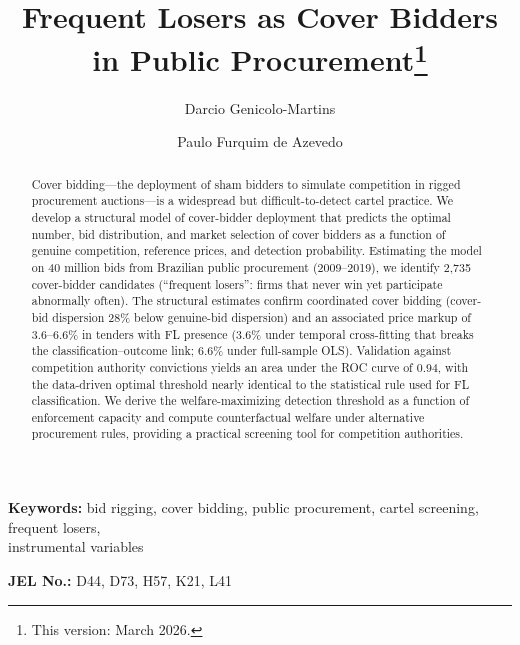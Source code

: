 \begin{frontmatter}

\title{Frequent Losers as Cover Bidders in Public Procurement\texorpdfstring{\footnote{This version: March 2026.}}{}}

\author[insper]{Darcio Genicolo-Martins}
\author[insper]{Paulo Furquim de Azevedo}

\begin{abstract} %
Cover bidding---the deployment of sham bidders to simulate competition
in rigged procurement auctions---is a widespread but difficult-to-detect
cartel practice. We develop a structural model of cover-bidder deployment
that predicts the optimal number, bid distribution, and market selection
of cover bidders as a function of genuine competition, reference prices,
and detection probability. Estimating the model on 40 million bids from
Brazilian public procurement (2009--2019), we identify 2,735
cover-bidder candidates (``frequent losers'': firms that never win yet
participate abnormally often). The structural estimates confirm coordinated cover %
bidding (cover-bid dispersion 28\% below genuine-bid dispersion) and
an associated price markup of 3.6--6.6\% in tenders with FL presence
(3.6\% under temporal cross-fitting that breaks the
classification--outcome link; 6.6\% under full-sample OLS).
Validation against competition authority convictions yields an area
under the ROC curve of 0.94, with the data-driven optimal threshold
nearly identical to the statistical rule used for FL classification.
We derive the welfare-maximizing detection threshold as a function of
enforcement capacity and compute counterfactual welfare under
alternative procurement rules, providing a practical screening tool
for competition authorities.
\end{abstract}

\end{frontmatter}

\noindent\textbf{Keywords:} bid rigging, cover bidding, public procurement, cartel screening, frequent losers,\\ instrumental variables

\noindent\textbf{JEL No.:} D44, D73, H57, K21, L41

\bigskip
